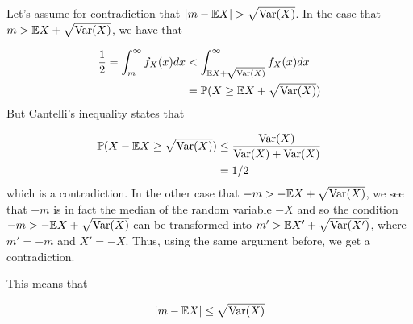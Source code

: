 
Let's assume for contradiction that $ |m - \mathbb{E} X| > \sqrt{ \mathrm{Var}(X)}$. In the case that $ m >
\mathbb{E} X + \sqrt{ \mathrm{Var}(X)}$, we have that 

\begin{align*}
    \frac{1}{2} = \int_{m}^{\infty} f_{X} (x) dx &< \int_{\mathbb{E} X + \sqrt{ \mathrm{Var}(X)}}^{\infty}
    f_{X} (x) dx\\
						 &= \mathbb P(X \geq \mathbb{E} X + \sqrt{ \mathrm{Var}(X)})\\
\end{align*}
But Cantelli's inequality states that

\begin{align*}
    \mathbb P( X- \mathbb{E} X \geq \sqrt{ \mathrm{Var}(X) }) &\leq \frac{ \mathrm{Var}(X)}{ \mathrm{Var}(X) +
    \mathrm{Var}(X)} \\
					       &= 1/2 
\end{align*}
which is a contradiction.
In the other case that $ -m > - \mathbb{E} X + \sqrt{ \mathrm{Var}(X)}$, we see that $ -m$ is in fact the
median of the random variable $ -X$ and so the condition $ -m > - \mathbb{E} X + \sqrt{ \mathrm{Var}(X)}$
can be transformed into $ m' > \mathbb{E} X' + \sqrt{ \mathrm{Var}(X')}$, where $ m' = -m$ and $ X' = -X$.
Thus, using the same argument before, we get a contradiction.

This means that

\begin{align*}
    |m - \mathbb{E} X| \leq \sqrt{ \mathrm{Var}(X)}
\end{align*}
